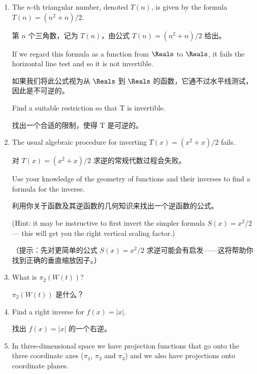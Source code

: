 \begin{enumerate}

    \item The $n$-th triangular number, denoted $T(n)$, is given by the formula
    $T(n) = (n^2 + n)/2$.
    
    \noindent 第 $n$ 个三角数，记为 $T(n)$，由公式 $T(n) = (n^2 + n)/2$ 给出。
    
    If we regard this formula as a function from $\Reals$ to
    $\Reals$, it fails the horizontal line test and so it is not invertible.
    
    如果我们将此公式视为从 $\Reals$ 到 $\Reals$ 的函数，它通不过水平线测试，因此是不可逆的。
    
    Find a
    suitable restriction so that T is invertible.
    
    找出一个合适的限制，使得 T 是可逆的。
    
    \wbvfill
    
    \item The usual algebraic procedure for inverting $T(x) = (x^2+x)/2$ fails.
    
    \noindent 对 $T(x) = (x^2+x)/2$ 求逆的常规代数过程会失败。
    
    Use
    your knowledge of the geometry of functions and their inverses to find
    a formula for the inverse.
    
    利用你关于函数及其逆函数的几何知识来找出一个逆函数的公式。
    
    (Hint: it may be instructive to first invert
    the simpler formula $S(x) = x^2/2$ --- this will get you the right vertical
    scaling factor.)
    
    （提示：先对更简单的公式 $S(x) = x^2/2$ 求逆可能会有启发——这将帮助你找到正确的垂直缩放因子。）
    
    \wbvfill
    
    \item What is $\pi_2(W(t))$?
    
    \noindent $\pi_2(W(t))$ 是什么？
    
    \wbvfill
    
    \item Find a right inverse for $f(x) = |x|$.
    
    \noindent 找出 $f(x) = |x|$ 的一个右逆。
    
    \wbvfill
    
    \workbookpagebreak
    
    \item In three-dimensional space we have projection functions that go onto
    the three coordinate axes ($\pi_1$, $\pi_2$ and $\pi_3$) and we also have
    projections onto coordinate planes.
    

\end{enumerate}
